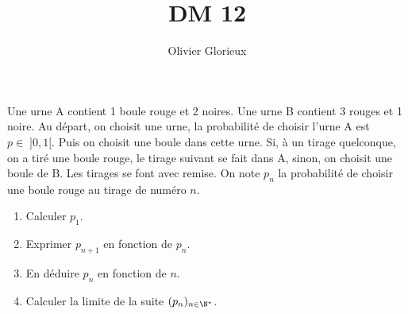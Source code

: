 \documentclass[a4paper, 11pt,reqno]{article}
\author{Olivier Glorieux}
\begin{document}
\title{DM 12 }






\begin{exercice}   \;
Une urne A contient 1 boule rouge et 2 noires. Une urne B contient 3 rouges et 1 noire. Au d\'epart, on choisit une urne, la probabilit\'e de choisir l'urne A est $p\in \; \rbrack 0,1\lbrack$. Puis on choisit une boule dans cette urne. Si, \`a un tirage quelconque, on a tir\'e une boule rouge, le tirage suivant se fait dans A, sinon, on choisit une boule de B. Les tirages se font avec remise. On note $p_n$ la probabilit\'e de choisir une boule rouge au tirage de num\'ero $n$.
\begin{enumerate}
\item  Calculer $p_1$.
\item Exprimer $p_{n+1}$ en fonction de $p_n$.
\item  En d\'eduire $p_n$ en fonction de $n$.
\item  Calculer la limite de la suite $(p_n)_{n\in\N^{\star}}$.
\end{enumerate} 
\end{exercice}
\end{document}
